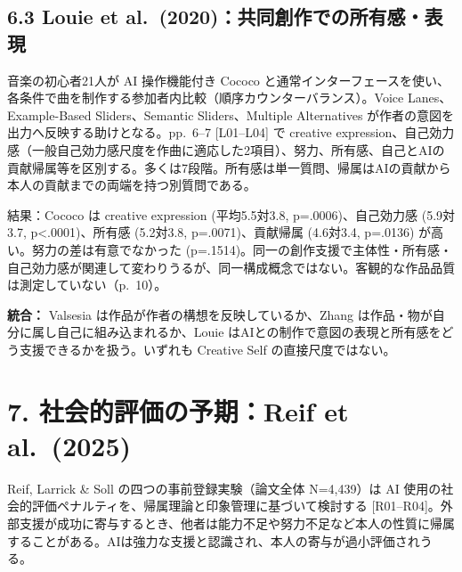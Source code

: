 \documentclass[
  11pt,
  a4paper,
]{article}
\begin{document}
\subsection{6.3 Louie et
al.~(2020)：共同創作での所有感・表現}\label{louie-et-al.-2020ux5171ux540cux5275ux4f5cux3067ux306eux6240ux6709ux611fux8868ux73fe}

音楽の初心者21人が AI 操作機能付き Cococo
と通常インターフェースを使い、各条件で曲を制作する参加者内比較（順序カウンターバランス）。Voice
Lanes、Example-Based Sliders、Semantic Sliders、Multiple Alternatives
が作者の意図を出力へ反映する助けとなる。pp.~6--7 {[}L01--L04{]} で
creative
expression、自己効力感（一般自己効力感尺度を作曲に適応した2項目）、努力、所有感、自己とAIの貢献帰属等を区別する。多くは7段階。所有感は単一質問、帰属はAIの貢献から本人の貢献までの両端を持つ別質問である。

結果：Cococo は creative expression (平均5.5対3.8, p=.0006)、自己効力感
(5.9対3.7, p\textless.0001)、所有感 (5.2対3.8, p=.0071)、貢献帰属
(4.6対3.4, p=.0136) が高い。努力の差は有意でなかった
(p=.1514)。同一の創作支援で主体性・所有感・自己効力感が関連して変わりうるが、同一構成概念ではない。客観的な作品品質は測定していない（p.~10）。

\textbf{統合：} Valsesia は作品が作者の構想を反映しているか、Zhang
は作品・物が自分に属し自己に組み込まれるか、Louie
はAIとの制作で意図の表現と所有感をどう支援できるかを扱う。いずれも
Creative Self の直接尺度ではない。

\section{7. 社会的評価の予期：Reif et
al.~(2025)}\label{ux793eux4f1aux7684ux8a55ux4fa1ux306eux4e88ux671freif-et-al.-2025}

Reif, Larrick \& Soll の四つの事前登録実験（論文全体 N=4,439）は AI
使用の社会的評価ペナルティを、帰属理論と印象管理に基づいて検討する
{[}R01--R04{]}。外部支援が成功に寄与するとき、他者は能力不足や努力不足など本人の性質に帰属することがある。AIは強力な支援と認識され、本人の寄与が過小評価されうる。
\end{document}
